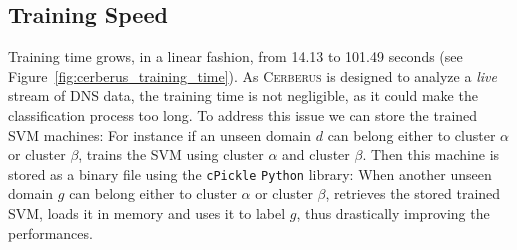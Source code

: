 \subsection{Training Speed} %
\label{sub:training_speed}
Training time grows, in a linear fashion, from 14.13 to 101.49 seconds
(see Figure~\ref{fig:cerberus_training_time}). As \textsc{Cerberus} is
designed to analyze a \emph{live} stream of DNS data, the training time is
not negligible, as it could make the classification process too long.
To address this issue we can store the trained SVM machines: For instance if
an unseen domain $d$ can belong either to cluster $\alpha$ or cluster $\beta$,
\thesystem trains the SVM using cluster $\alpha$ and cluster $\beta$. Then this
machine is stored as a binary file using the \texttt{cPickle} \texttt{Python}
library: When another unseen domain $g$ can belong either to cluster $\alpha$ or
cluster $\beta$, \thesystem retrieves the stored trained SVM, loads it in
memory and uses it to label $g$, thus drastically improving the performances.
